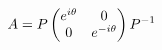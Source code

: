 \documentclass[preview]{standalone}
\begin{document}
\begin{align*}
\special{dvisvgm:raw <g id='unique000'>}A=P\begin{pmatrix}e^{i\theta}&0\\0&e^{-i\theta}\end{pmatrix}P^{-1}\special{dvisvgm:raw </g>}
\end{align*}
\end{document}
